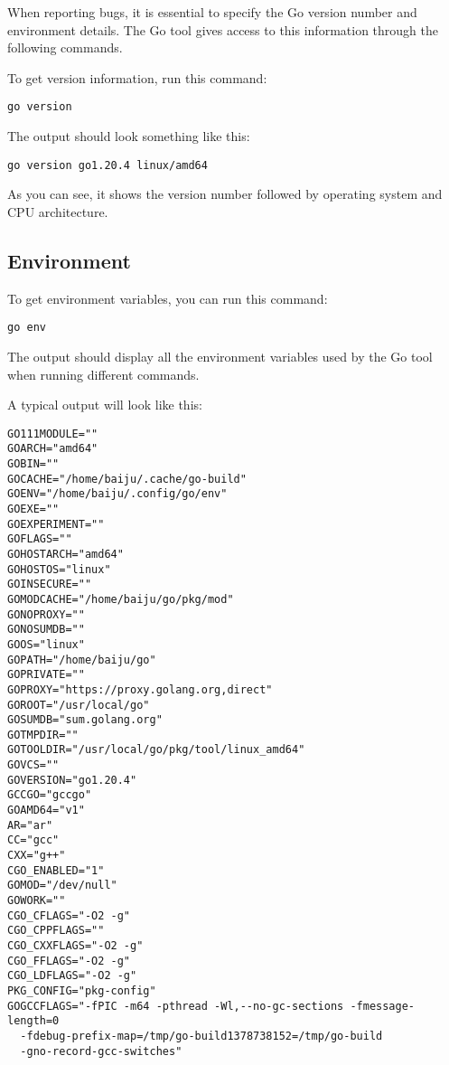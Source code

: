 When reporting bugs, it is essential to specify the Go version
number and environment details. The Go tool gives access to this information
through the following commands.

To get version information, run this command:

\begin{lstlisting}[numbers=none]
go version
\end{lstlisting}

The output should look something like this:

\begin{lstlisting}[numbers=none]
go version go1.20.4 linux/amd64
\end{lstlisting}

As you can see, it shows the version number followed by operating
system and CPU architecture.

\subsection{Environment}

To get environment variables, you can run this command:

\begin{lstlisting}[numbers=none]
go env
\end{lstlisting}

The output should display all the environment variables used by the Go
tool when running different commands.

A typical output will look like this:

\begin{lstlisting}[numbers=none]
GO111MODULE=""
GOARCH="amd64"
GOBIN=""
GOCACHE="/home/baiju/.cache/go-build"
GOENV="/home/baiju/.config/go/env"
GOEXE=""
GOEXPERIMENT=""
GOFLAGS=""
GOHOSTARCH="amd64"
GOHOSTOS="linux"
GOINSECURE=""
GOMODCACHE="/home/baiju/go/pkg/mod"
GONOPROXY=""
GONOSUMDB=""
GOOS="linux"
GOPATH="/home/baiju/go"
GOPRIVATE=""
GOPROXY="https://proxy.golang.org,direct"
GOROOT="/usr/local/go"
GOSUMDB="sum.golang.org"
GOTMPDIR=""
GOTOOLDIR="/usr/local/go/pkg/tool/linux_amd64"
GOVCS=""
GOVERSION="go1.20.4"
GCCGO="gccgo"
GOAMD64="v1"
AR="ar"
CC="gcc"
CXX="g++"
CGO_ENABLED="1"
GOMOD="/dev/null"
GOWORK=""
CGO_CFLAGS="-O2 -g"
CGO_CPPFLAGS=""
CGO_CXXFLAGS="-O2 -g"
CGO_FFLAGS="-O2 -g"
CGO_LDFLAGS="-O2 -g"
PKG_CONFIG="pkg-config"
GOGCCFLAGS="-fPIC -m64 -pthread -Wl,--no-gc-sections -fmessage-length=0
  -fdebug-prefix-map=/tmp/go-build1378738152=/tmp/go-build
  -gno-record-gcc-switches"
\end{lstlisting}

